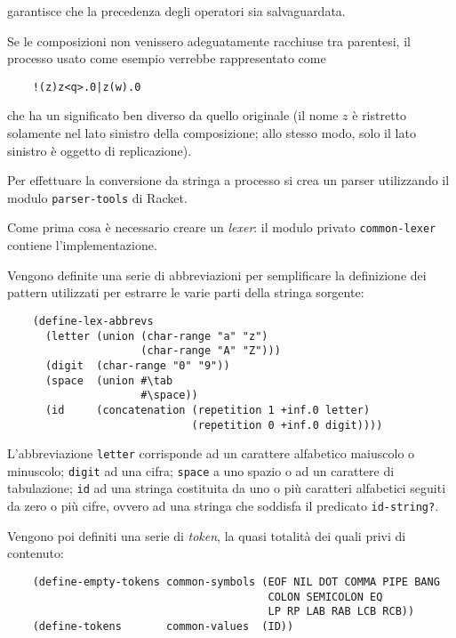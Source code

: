 garantisce che la precedenza degli operatori sia salvaguardata.

Se le composizioni non venissero adeguatamente racchiuse tra parentesi,
il processo usato come esempio verrebbe rappresentato come

\begin{lstlisting}
    !(z)z<q>.0|z(w).0
\end{lstlisting}

che ha un significato ben diverso da quello originale (il nome $z$ \`e
ristretto solamente nel lato sinistro della composizione; allo stesso
modo, solo il lato sinistro \`e oggetto di replicazione).

Per effettuare la conversione da stringa a processo si crea un parser
utilizzando il modulo \lstinline{parser-tools} di Racket.

Come prima cosa \`e necessario creare un \emph{lexer}: il modulo
privato \lstinline{common-lexer} contiene l'implementazione.

Vengono definite una serie di abbreviazioni per semplificare la
definizione dei pattern utilizzati per estrarre le varie parti della
stringa sorgente:

\begin{lstlisting}
    (define-lex-abbrevs
      (letter (union (char-range "a" "z")
                     (char-range "A" "Z")))
      (digit  (char-range "0" "9"))
      (space  (union #\tab
                     #\space))
      (id     (concatenation (repetition 1 +inf.0 letter)
                             (repetition 0 +inf.0 digit))))
\end{lstlisting}

L'abbreviazione \lstinline{letter} corrisponde ad un carattere alfabetico
maiuscolo o minuscolo; \lstinline{digit} ad una cifra; \lstinline{space}
a uno spazio o ad un carattere di tabulazione; \lstinline{id} ad una
stringa costituita da uno o pi\`u caratteri alfabetici seguiti da zero o
pi\`u cifre, ovvero ad una stringa che soddisfa il predicato
\lstinline{id-string?}.

Vengono poi definiti una serie di \emph{token}, la quasi totalit\`a dei
quali privi di contenuto:

\begin{lstlisting}
    (define-empty-tokens common-symbols (EOF NIL DOT COMMA PIPE BANG
                                         COLON SEMICOLON EQ
                                         LP RP LAB RAB LCB RCB))
    (define-tokens       common-values  (ID))
\end{lstlisting}


